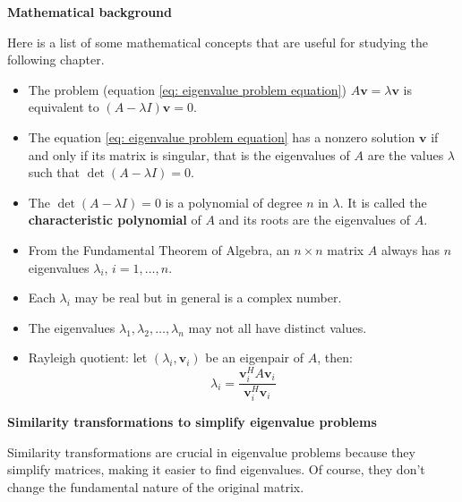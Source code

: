 \begin{flushleft}
    \textcolor{Green3}{ \textbf{Mathematical background}}
\end{flushleft}
Here is a list of some mathematical concepts that are useful for studying the following chapter.
\begin{itemize}
    \item The problem (equation \ref{eq: eigenvalue problem equation}) $A\mathbf{v} = \lambda \mathbf{v}$ is equivalent to $\left(A - \lambda I\right) \mathbf{v} = 0$.
    
    \item The equation \ref{eq: eigenvalue problem equation} has a nonzero solution $\mathbf{v}$ if and only if its matrix is singular, that is the eigenvalues of $A$ are the values $\lambda$ such that $\det\left(A - \lambda I\right) = 0$.

    \item The $\det\left(A - \lambda I\right) = 0$ is a polynomial of degree $n$ in $\lambda$. It is called the \textbf{characteristic polynomial} of $A$ and its roots are the eigenvalues of $A$.
    
    \item From the Fundamental Theorem of Algebra, an $n \times n$ matrix $A$ always has $n$ eigenvalues $\lambda_{i}$, $i = 1, \dots, n$.

    \item Each $\lambda_{i}$ may be real but in general is a complex number.
    
    \item The eigenvalues $\lambda_{1}, \lambda_{2}, \dots, \lambda_{n}$ may not all have distinct values.
    
    \item Rayleigh quotient: let $\left(\lambda_{i}, \mathbf{v}_{i}\right)$ be an eigenpair of $A$, then:
    \begin{equation*}
        \lambda_{i} = \dfrac{
            \mathbf{v}_{i}^{H} A \mathbf{v}_{i}
        }{
            \mathbf{v}_{i}^{H} \mathbf{v}_{i}
        }
    \end{equation*}
\end{itemize}

\newpage

\begin{flushleft}
    \textcolor{Green3}{ \textbf{Similarity transformations to simplify eigenvalue problems}}
\end{flushleft}
Similarity transformations are crucial in eigenvalue problems because they simplify matrices, making it easier to find eigenvalues. Of course, they don't change the fundamental nature of the original matrix.

